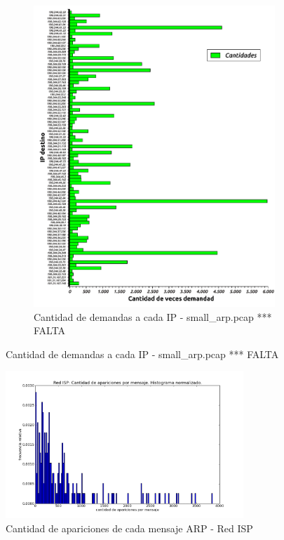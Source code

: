 \begin{figure}[H]
\begin{subfigure}[H]{0.5\textwidth}
                \includegraphics[width=1\textwidth]{graficos/cantidadConsultasCasaJulian.pdf}
                \caption{Cantidad de demandas a cada IP - small\_arp.pcap *** FALTA}
                \label{fig:hist4}
        \end{subfigure}
\end{figure}

\begin{figure}[H]
	\centering
	\includegraphics[width=0.8\textwidth]{graficos/hist_casa.png}
	\caption{Cantidad de apariciones de cada mensaje ARP - Red ISP}
	\label{fig:hist5}
\end{figure}

